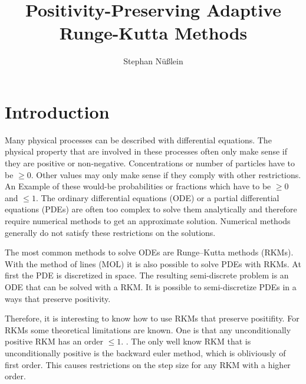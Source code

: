 \documentclass[a4paper]{scrartcl}
\title{Positivity-Preserving Adaptive Runge-Kutta Methods}
\author{Stephan Nüßlein}
\numberwithin{equation}{section}
\theoremstyle{plain}
\theoremstyle{definition}
\numberwithin{theorem}{section}
\newcommand{\1}{\mathbbm{1}}
\begin{document}
\maketitle

\section{Introduction}


Many physical processes can be described with differential equations. 
The physical property that are involved in these processes often only make sense if they are positive or non-negative. 
Concentrations or number of particles have to be $\geq 0$.
Other values may only make sense if they comply with other restrictions. An Example of these would-be probabilities or fractions which have to be $\geq 0$ and $\leq 1$.
The ordinary differential equations (ODE) or a partial differential equations (PDEs) are often too complex to solve them analytically and therefore require numerical methods to get an approximate solution.
Numerical methods generally do not satisfy these restrictions on the solutions.

The most common methods to solve ODEs are Runge–Kutta methods (RKMs). 
With the method of lines (MOL) it is also possible to solve PDEs with RKMs.
At first the PDE is discretized in space. The resulting semi-discrete problem is an ODE that can be solved with a RKM. 
It is possible to semi-discretize PDEs in a ways that preserve positivity\cite{kopecz_comparison_2019,kopecz_unconditionally_2018}.

Therefore, it is interesting to know how to use RKMs that preserve positifity.
For RKMs some theoretical limitations are known. One is that any unconditionally positive RKM has an order $\leq 1$. \cite{hundsdorfer_numerical_2003,bolley_conservation_1978,horvath_positivity_1998}. The only well know RKM that is unconditionally positive is the backward euler method, which is obliviously of first order. 
This causes restrictions on the step size for any RKM with a higher order.
\end{document}
